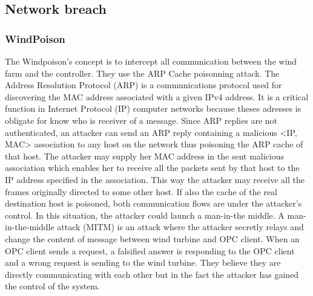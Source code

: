 \documentclass[twosided,a4,10pt]{article}
\begin{document}
\begin{multicols}{2}
\subsection{Network breach}

\subsubsection{WindPoison}
The Windpoison’s concept is to intercept all communication between the wind farm and the controller. They use the ARP Cache poisonning attack. The Address Resolution Protocol (ARP) is a communications protocol used for discovering the MAC address associated with a given IPv4 address. It is a critical function in Internet Protocol (IP) computer networks because theses adresses is obligate for know who is receiver of a message. \newline Since ARP replies are not authenticated, an attacker can send an ARP reply containing a malicious <IP, MAC> association to any host on the network thus poisoning the ARP cache of that host. The attacker may supply her MAC address in the sent malicious association which enables her to receive all the packets sent by that host to the IP address specified in the association. This way the attacker may receive all the frames originally directed to some other host. If also the cache of the real destination host is poisoned, both communication flows are under the attacker's control. \newline
In this situation, the attacker could launch a man-in-the middle. A man-in-the-middle attack (MITM) is an attack where the attacker secretly relays and change the content of message between wind turbine and OPC client. When an OPC client sends a request, a falsified answer is responding to the OPC client and a wrong request is sending to the wind turbine.  They believe they are directly communicating with each other but in the fact the attacker has gained the control of the system. 



\end{multicols}
\end{document}
